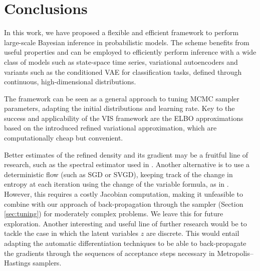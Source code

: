 
\section{Conclusions}

In this work, we have proposed a flexible and efficient framework to perform
large-scale Bayesian inference in probabilistic models. The scheme benefits from useful properties and can be 
employed to efficiently perform inference with a wide class of models such as state-space time series, variational autoencoders {and variants such as the conditioned VAE for classification tasks}, defined through continuous, high-dimensional distributions.

The framework can be seen as a general 
approach to tuning MCMC sampler parameters, adapting the initial distributions and learning rate. %
Key to the success and applicability of the VIS framework are the ELBO approximations based on the introduced refined variational approximation, which are computationally cheap but convenient. 

Better estimates of the refined density and its gradient may be a fruitful line of research, such as the spectral estimator used in \cite{shi2018spectral}. Another alternative is to use a deterministic flow (such as SGD or SVGD), keeping
track of the change in entropy at each iteration using the change of the variable formula, as in \cite{duvenaud2016early}. However, this requires a costly Jacobian computation, making it unfeasible to combine with our approach of back-propagation through the sampler (Section \ref{sec:tuning}) for moderately complex problems. We leave this for future exploration. {Another interesting and useful line of further research would be to tackle the case in which the latent variables $z$ are discrete. This would entail adapting the automatic differentiation techniques to be able to back-propagate the gradients through the sequences of acceptance steps necessary in Metropolis--Hastings samplers.}

